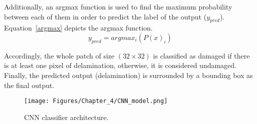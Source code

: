 Additionally, an argmax function is used to find the maximum probability between each of them in order to predict the label of the output (\(y_{pred}\)).
Equation~\ref{argmax} depicts the argmax function.
\begin{equation}
	y_{pred} = argmax_{i}\left( P(x)_{i} \right)
	\label{argmax}
\end{equation}

Accordingly, the whole patch of size \((32\times 32)\) is classified as damaged if there is at least one pixel of delamination, otherwise, it is considered undamaged.
Finally, the predicted output (delamination) is surrounded by a bounding box as the final output.
\begin{figure}[h!]
	\centering
	\texttt{[image: Figures/Chapter\_4/CNN\_model.png]}
	\caption{CNN classifier architecture.}
	\label{CNN_model}
\end{figure}
